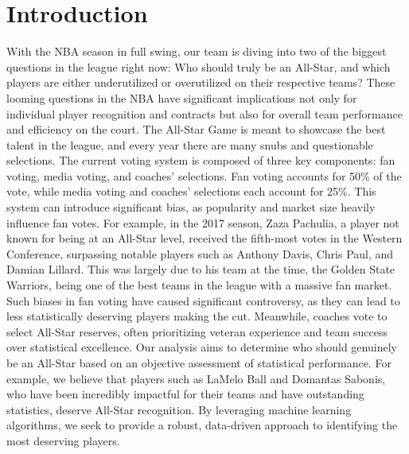 \documentclass[12pt]{article}
\begin{document}
\section{Introduction}
With the NBA season in full swing, our team is diving into two of the biggest questions in the league right now: Who should truly be an All-Star, and which players are either underutilized or overutilized on their respective teams? These looming questions in the NBA have significant implications not only for individual player recognition and contracts but also for overall team performance and efficiency on the court.
The All-Star Game is meant to showcase the best talent in the league, and every year there are many snubs and questionable selections. The current voting system is composed of three key components: fan voting, media voting, and coaches’ selections. Fan voting accounts for 50\% of the vote, while media voting and coaches’ selections each account for 25\%. This system can introduce significant bias, as popularity and market size heavily influence fan votes. For example, in the 2017 season, Zaza Pachulia, a player not known for being at an All-Star level, received the fifth-most votes in the Western Conference, surpassing notable players such as Anthony Davis, Chris Paul, and Damian Lillard. This was largely due to his team at the time, the Golden State Warriors, being one of the best teams in the league with a massive fan market. Such biases in fan voting have caused significant controversy, as they can lead to less statistically deserving players making the cut. Meanwhile, coaches vote to select All-Star reserves, often prioritizing veteran experience and team success over statistical excellence. Our analysis aims to determine who should genuinely be an All-Star based on an objective assessment of statistical performance. For example, we believe that players such as LaMelo Ball and Domantas Sabonis, who have been incredibly impactful for their teams and have outstanding statistics, deserve All-Star recognition. By leveraging machine learning algorithms, we seek to provide a robust, data-driven approach to identifying the most deserving players.
\end{document}
